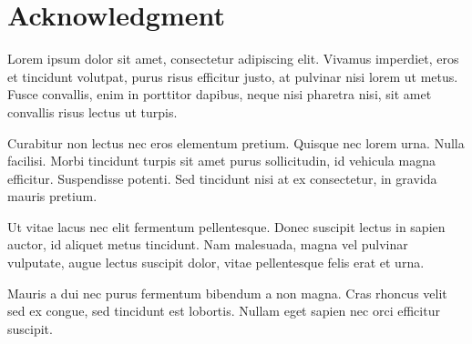 \section*{Acknowledgment}

Lorem ipsum dolor sit amet, consectetur adipiscing elit. Vivamus imperdiet, eros et tincidunt volutpat, purus risus efficitur justo, at pulvinar nisi lorem ut metus. Fusce convallis, enim in porttitor dapibus, neque nisi pharetra nisi, sit amet convallis risus lectus ut turpis.

Curabitur non lectus nec eros elementum pretium. Quisque nec lorem urna. Nulla facilisi. Morbi tincidunt turpis sit amet purus sollicitudin, id vehicula magna efficitur. Suspendisse potenti. Sed tincidunt nisi at ex consectetur, in gravida mauris pretium.

Ut vitae lacus nec elit fermentum pellentesque. Donec suscipit lectus in sapien auctor, id aliquet metus tincidunt. Nam malesuada, magna vel pulvinar vulputate, augue lectus suscipit dolor, vitae pellentesque felis erat et urna. 

Mauris a dui nec purus fermentum bibendum a non magna. Cras rhoncus velit sed ex congue, sed tincidunt est lobortis. Nullam eget sapien nec orci efficitur suscipit.

